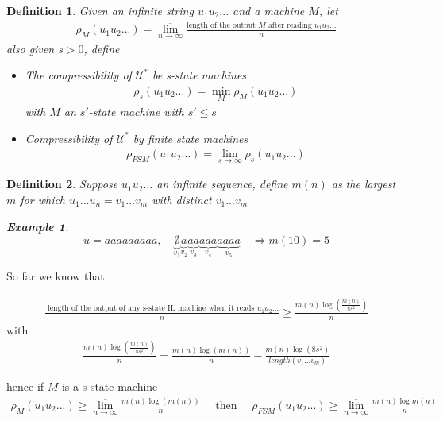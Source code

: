 \documentclass{article}
\newtheorem{definition}{Definition}[section]
\theoremstyle{definition} %
\newtheorem{example}{Example}
\def\U{\mathcal{U}}
\begin{document}
\begin{definition}
  Given an infinite string $u_1 u_2 ...$ and a machine $M$, let
  \begin{align*}
    \rho_{M}(u_1 u_2 ...) = \overline{\lim_{n \to \infty}} \frac{\text{length of the output } M \text{ after reading } u_1 u_2...}{n}
  \end{align*}
  also given $s > 0$, define
  \begin{itemize}
    \item The compressibility of $\U^*$ be s-state machines
    \begin{align*}
      \rho_s (u_1 u_2 ...) = \min_{M} \rho_{M}(u_1 u_2 ...)
    \end{align*}
    with $M$ an $s'$-state machine with $s' \leq s$
    \item Compressibility of $\U^*$ by finite state machines
    \begin{align*}
      \rho_{FSM} (u_1 u_2 ...) = \lim_{s \to \infty} \rho_s (u_1 u_2 ...)
    \end{align*}
  \end{itemize}
\end{definition}

\begin{definition}
  Suppose $u_1 u_2 ...$ an infinite sequence, define $m(n)$ as the largest $m$ for which $u_1 ... u_n = v_1 ... v_m$ with distinct $v_1 ... v_m$
  \begin{example}
    $$ u = aaaaaaaaa, \quad \underbrace{\emptyset}_{v_1} \underbrace{a}_{v_2} \underbrace{aa}_{v_3} \underbrace{aaa}_{v_4} \underbrace{aaaa}_{v_5} \quad \Rightarrow m(10) = 5 $$
  \end{example}
\end{definition}

So far we know that

\begin{align*}
  \frac{\text{ length of the output of any s-state IL machine when it reads } u_1 u_2 ... }{n} \geq \frac{m(n) \log(\frac{m(n)}{8 s^2})}{n}
\end{align*}
with
\begin{align*}
  \frac{m(n) \log(\frac{m(n)}{8 s^2})}{n} = \frac{m(n) \log(m(n))}{n} - \frac{m(n) \log(8 s^2)}{length(v_1 ... v_m)}
\end{align*}

hence if $M$ is a s-state machine
\begin{align*}
  \rho_M (u_1 u_2 ...) \geq \overline{\lim_{n \to \infty}} \frac{m(n) \log(m(n))}{n}
  \quad \text{ then } \quad
  \rho_{FSM} (u_1 u_2 ...) \geq \overline{\lim_{n \to \infty}} \frac{m(n) \log m(n)}{n}
\end{align*}
\end{document}
